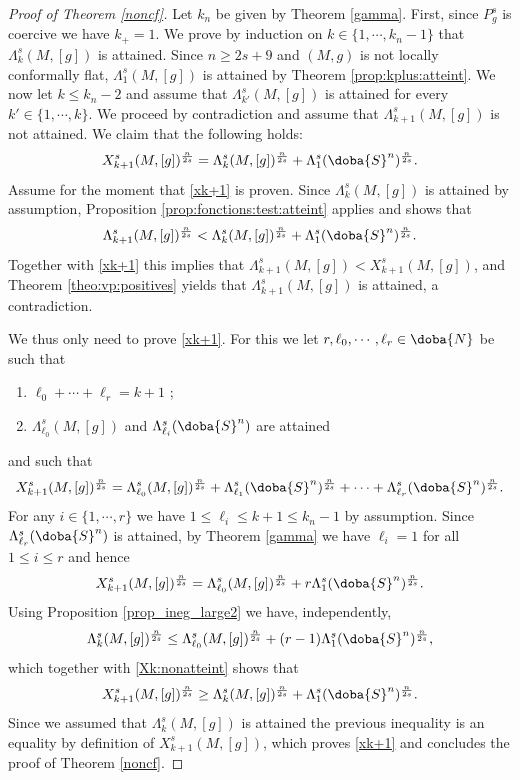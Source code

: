 \documentclass[10pt]{amsart}
\numberwithin{equation}{section}
\def\La{{\Lambda}}
\gdef\mN{\doba{N}}
\gdef\mS{\doba{S}}
\theoremstyle{plain}
\theoremstyle{remark}
\begin{document}
\begin{proof}[Proof of Theorem \ref{noncf}]
Let $k_n$ be given by Theorem \ref{gamma}. First, since $P_g^s$ is coercive we have $k_+=1$. We prove by induction on $k \in \{1,\cdots,k_n-1\}$ that $\La_k^s(M,[g])$ is attained. Since $n \ge 2s+9$ and $(M,g)$ is not locally conformally flat, $\La_{1}^s(M,[g])$ is attained by Theorem \ref{prop:kplus:atteint}. We now let $k \leq k_n-2 $ and assume that $\La_{k'}^s(M,[g])$ is attained for every  $k' \in  \{1,\cdots,k\}$. We proceed by contradiction and assume that $\La_{k+1}^s(M,[g])$ is not attained. We claim that the following holds:
\begin{equation} \label{xk+1}
 X_{k+1}^s(M,[g])^{\frac{n}{2s}}= \La_k^s(M,[g])^{\frac{n}{2s}}+\Lambda_1^s(\mS^n)^{\frac{n}{2s}}.
\end{equation}
Assume for the moment that \eqref{xk+1} is proven. Since $\La_{k}^s(M,[g])$ is attained by assumption, Proposition \ref{prop:fonctions:test:atteint} applies and shows that 
$$  \Lambda_{k+1}^s(M,[g])^{\frac{n}{2s}}< \La_k^s(M,[g])^{\frac{n}{2s}}+\Lambda_1^s(\mS^n)^{\frac{n}{2s}}.$$ 
Together with \eqref{xk+1} this implies that  $  \Lambda_{k+1}^s(M,[g]) <  X_{k+1}^s(M,[g])$, and Theorem  \ref{theo:vp:positives} yields that $\La_{k+1}^s(M,[g])$ is attained, a contradiction. 

We thus only need to prove \eqref{xk+1}. For this we let  $r,\ell_0,\cdots,\ell_r \in \mN$ be such that 
\begin{enumerate}
 \item $\ell_0  + \cdots + \ell_r =k+1$ ; 
 \item $\La_{\ell_0}^s(M,[g])$ and $\La_{\ell_i}^s(\mS^n)$ are attained  
\end{enumerate}
and such that 
$$X_{k+1}^s(M,[g])^{\frac{n}{2s}}=  \La_{\ell_0}^s(M,[g])^{\frac{n}{2s}} + \La_{\ell_1}^s(\mS^n)^{\frac{n}{2s}} +  \cdots + \La_{\ell_{r}}^s(\mS^n)^{\frac{n}{2s}} .$$
For any $i \in \{1, \cdots, r\}$ we have $1 \le \ell_i \le k+1 \le k_n-1$ by assumption. Since $\La_{\ell_{r}}^s(\mS^n)$ is attained, by Theorem \ref{gamma} we have $\ell_i=1$ for all $1 \le i \le r$ and hence
\begin{equation} \label{Xk:nonatteint}
 X_{k+1}^s(M,[g])^{\frac{n}{2s}}=  \La_{\ell_0}^s(M,[g])^{\frac{n}{2s}} + r \La_{1}^s(\mS^n)^{\frac{n}{2s}} . 
 \end{equation}
Using Proposition \ref{prop_ineg_large2} we have, independently, 
$$\La_k^s(M,[g])^{\frac{n}{2s}} \le  \La_{\ell_0}^s(M,[g])^{\frac{n}{2s}} + (r-1) \La_{1}^s(\mS^n)^{\frac{n}{2s}}, $$
which together with \eqref{Xk:nonatteint} shows that 
$$ X_{k+1}^s(M,[g])^{\frac{n}{2s}} \ge \La_k^s(M,[g])^{\frac{n}{2s}} +  \La_{1}^s(\mS^n)^{\frac{n}{2s}}. $$
Since we assumed that $ \La_k^s(M,[g])$ is attained the previous inequality is an equality by definition of $X_{k+1}^s(M,[g])$, which proves \eqref{xk+1} and concludes the proof of Theorem \ref{noncf}.
\end{proof}
\end{document}
